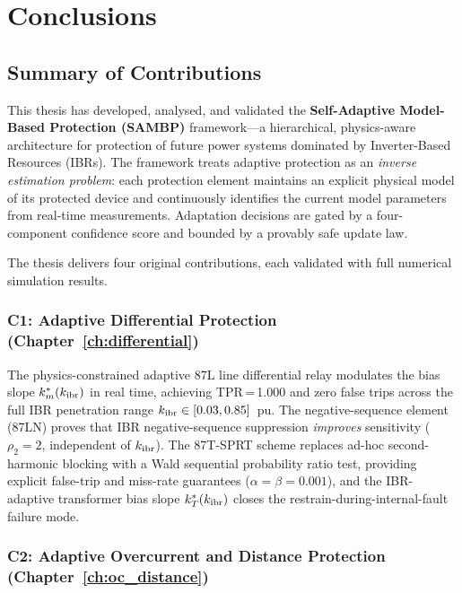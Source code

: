 \chapter{Conclusions}
\label{ch:conclusions}

\section{Summary of Contributions}
\label{sec:ch13_summary}

This thesis has developed, analysed, and validated the \textbf{Self-Adaptive
Model-Based Protection (SAMBP)} framework---a hierarchical, physics-aware
architecture for protection of future power systems dominated by
Inverter-Based Resources (IBRs). The framework treats adaptive protection
as an \emph{inverse estimation problem}: each protection element maintains
an explicit physical model of its protected device and continuously
identifies the current model parameters from real-time measurements.
Adaptation decisions are gated by a four-component confidence score and
bounded by a provably safe update law.

The thesis delivers four original contributions, each validated with
full numerical simulation results.

\subsection{C1: Adaptive Differential Protection (Chapter~\ref{ch:differential})}

The physics-constrained adaptive 87L line differential relay modulates
the bias slope $k_m^*(k_\mathrm{ibr})$ in real time, achieving TPR\,=\,1.000 and
zero false trips across the full IBR penetration range
$k_\mathrm{ibr} \in [0.03, 0.85]$~pu. The negative-sequence element (87LN) proves
that IBR negative-sequence suppression \emph{improves} sensitivity
($\rho_2 = 2$, independent of $k_\mathrm{ibr}$). The 87T-SPRT scheme replaces
ad-hoc second-harmonic blocking with a Wald sequential probability ratio
test, providing explicit false-trip and miss-rate guarantees
($\alpha = \beta = 0.001$), and the IBR-adaptive transformer bias slope
$k_T^*(k_\mathrm{ibr})$ closes the restrain-during-internal-fault failure mode.

\subsection{C2: Adaptive Overcurrent and Distance Protection (Chapter~\ref{ch:oc_distance})}

